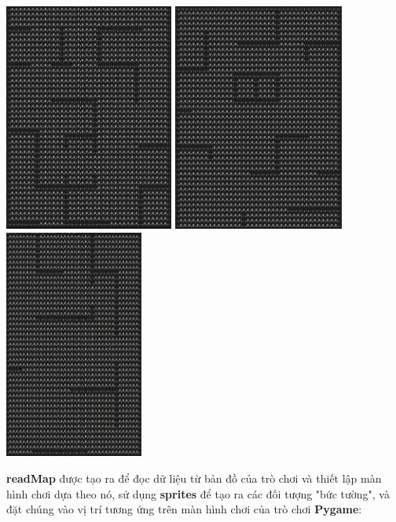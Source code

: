 \documentclass[a4paper]{article}
\begin{document}
\includegraphics[width=2.18611in,height=2.95139in]{image49.png}
\includegraphics[width=2.21389in,height=2.95139in]{image50.png}
\includegraphics[width=1.78889in,height=2.9625in]{image51.png}

\textbf{readMap} được tạo ra để đọc dữ liệu từ bản đồ của trò chơi và
thiết lập màn hình chơi dựa theo nó, sử dụng \textbf{sprites} để tạo ra
các đối tượng "bức tường", và đặt chúng vào vị trí tương ứng trên màn hình chơi của trò chơi \textbf{Pygame}:
\end{document}
